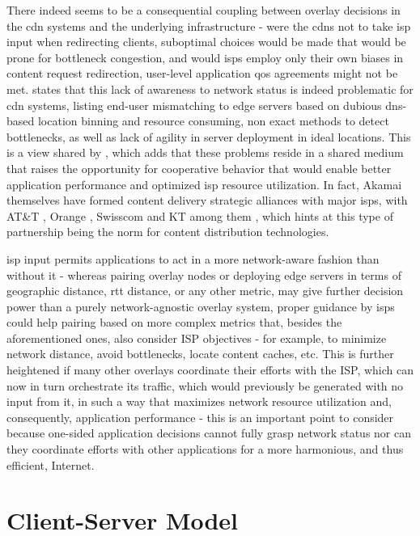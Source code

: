     There indeed seems to be a consequential coupling between overlay decisions in the \gls{cdn} systems and the underlying infrastructure - were the \glspl{cdn} not to take \gls{isp} input when redirecting clients, suboptimal choices would be made that would be prone for bottleneck congestion, and would \glspl{isp} employ only their own biases in content request redirection, user-level application \gls{qos} agreements might not be met.
        \cite{pushing-cdn-isp-collaboration} states that this lack of awareness to network status is indeed problematic for \gls{cdn} systems, listing end-user mismatching to edge servers based on dubious \gls{dns}-based location binning and resource consuming, non exact methods to detect bottlenecks, as well as lack of agility in server deployment in ideal locations.
        This is a view shared by \cite{cdn-isp-cooperations}, which adds that these problems reside in a shared medium that raises the opportunity for cooperative behavior that would enable better application performance and optimized \gls{isp} resource utilization.
    In fact, Akamai themselves have formed content delivery strategic alliances with major \glspl{isp}, with AT\&T \cite{att}, Orange \cite{orange}, Swisscom \cite{swisscom} and KT \cite {kt} among them \cite{pushing-cdn-isp-collaboration}, which hints at this type of partnership being the norm for content distribution technologies.

        \gls{isp} input permits applications to act in a more network-aware fashion than without it - whereas pairing overlay nodes or deploying edge servers in terms of geographic distance, \gls{rtt} distance, or any other metric, may give further decision power than a purely network-agnostic overlay system, proper guidance by \glspl{isp} could help pairing based on more complex metrics that, besides the aforementioned ones, also consider ISP objectives - for example, to minimize network distance, avoid bottlenecks, locate content caches, etc.
        This is further heightened if many other overlays coordinate their efforts with the ISP, which can now in turn orchestrate its traffic, which would previously be generated with no input from it, in such a way that maximizes network resource utilization and, consequently, application performance - this is an important point to consider because one-sided application decisions cannot fully grasp network status nor can they coordinate efforts with other applications for a more harmonious, and thus efficient, Internet.


\section{Client-Server Model}

